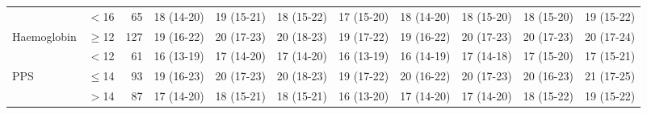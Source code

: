 \begin{sidewaystable}[p]
\begin{tabular}{|llr | c c c c c c c c|}
		                    & $<$16     & 65  & 18 (14-20) & 19 (15-21) & 18 (15-22) & 17 (15-20) & 18 (14-20) & 18 (15-20) & 18 (15-20) & 19 (15-22) \\
		Haemoglobin         & $\geq$12  & 127 & 19 (16-22) & 20 (17-23) & 20 (18-23) & 19 (17-22) & 19 (16-22) & 20 (17-23) & 20 (17-23) & 20 (17-24) \\
		                    & $<$12     & 61  & 16 (13-19) & 17 (14-20) & 17 (14-20) & 16 (13-19) & 16 (14-19) & 17 (14-18) & 17 (15-20) & 17 (15-21) \\
		PPS                 & $\leq$14  & 93  & 19 (16-23) & 20 (17-23) & 20 (18-23) & 19 (17-22) & 20 (16-22) & 20 (17-23) & 20 (16-23) & 21 (17-25) \\
		                    & $>$14     & 87  & 17 (14-20) & 18 (15-21) & 18 (15-21) & 16 (13-20) & 17 (14-20) & 17 (14-20) & 18 (15-22) & 19 (15-22)\\ \hline
	\end{tabular}	
\end{sidewaystable}





































